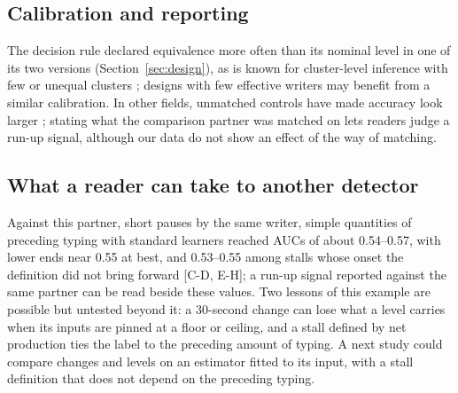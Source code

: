 \subsection{Calibration and reporting}

The decision rule declared equivalence more often than its nominal level in one of its two versions
(Section~\ref{sec:design}), as is known for cluster-level inference with few or unequal clusters
\cite{cameron2008bootstrap,cameron2015practitioner,mackinnon2023cluster}; designs with few effective writers may
benefit from a similar calibration. In other fields, unmatched controls have made accuracy look
larger \cite{lijmer1999empirical,pepe2008pivotal}; stating what the comparison partner was matched on lets readers judge
a run-up signal, although our data do not show an effect of the way of matching.

\subsection{What a reader can take to another detector}

Against this partner, short pauses by the same writer, simple quantities of preceding typing with standard learners
reached AUCs of about 0.54--0.57, with lower ends near 0.55 at best, and 0.53--0.55 among stalls whose onset the
definition did not bring forward [C-D, E-H]; a run-up signal reported against the same partner can be read beside these
values. Two lessons of this example are possible but untested beyond it: a 30-second change can lose what a level
carries when its inputs are pinned at a floor or ceiling, and a stall defined by net production ties the label to the
preceding amount of typing. A next study could compare changes and levels on an estimator fitted to its input, with a
stall definition that does not depend on the preceding typing.

